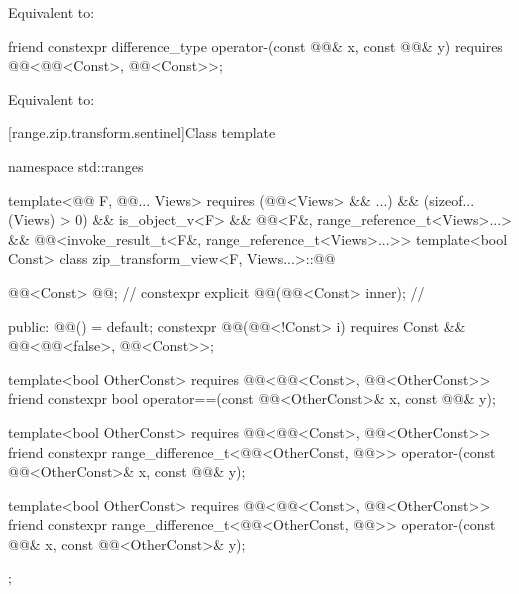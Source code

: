 \begin{itemdescr}
\pnum
\effects
Equivalent to:
\end{itemdescr}

%
\begin{itemdecl}
friend constexpr difference_type operator-(const @@& x, const @@& y)
  requires @@<@@<Const>, @@<Const>>;
\end{itemdecl}

\begin{itemdescr}
\pnum
\effects
Equivalent to:
\end{itemdescr}

[range.zip.transform.sentinel]{Class template }

%
\begin{codeblock}
namespace std::ranges {
  template<@@ F, @@... Views>
    requires (@@<Views> && ...) && (sizeof...(Views) > 0) && is_object_v<F> &&
              @@<F&, range_reference_t<Views>...> &&
              @@<invoke_result_t<F&, range_reference_t<Views>...>>
  template<bool Const>
  class zip_transform_view<F, Views...>::@@ {
    @@<Const> @@;                                     // \expos
    constexpr explicit @@(@@<Const> inner);         // \expos

  public:
    @@() = default;
    constexpr @@(@@<!Const> i)
      requires Const && @@<@@<false>, @@<Const>>;

    template<bool OtherConst>
      requires @@<@@<Const>, @@<OtherConst>>
    friend constexpr bool operator==(const @@<OtherConst>& x, const @@& y);

    template<bool OtherConst>
      requires @@<@@<Const>, @@<OtherConst>>
    friend constexpr range_difference_t<@@<OtherConst, @@>>
      operator-(const @@<OtherConst>& x, const @@& y);

    template<bool OtherConst>
      requires @@<@@<Const>, @@<OtherConst>>
    friend constexpr range_difference_t<@@<OtherConst, @@>>
      operator-(const @@& x, const @@<OtherConst>& y);
  };
}
\end{codeblock}

